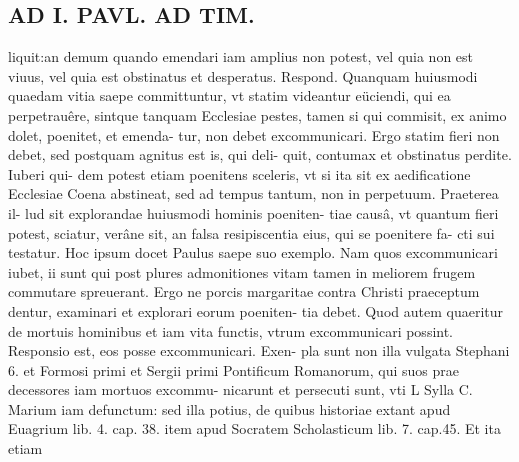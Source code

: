 \documentclass{article}
\begin{document}
\begin{pages}
\section*{AD I. PAVL. AD TIM. }
\marginpar{[ p.330 ]}\pstart liquit:an demum quando emendari iam amplius non potest, vel quia non est viuus, vel quia est obstinatus et desperatus. Respond. Quanquam huiusmodi quaedam vitia saepe committuntur, vt statim videantur eüciendi, qui ea perpetrauêre, sintque tanquam Ecclesiae pestes, tamen si qui commisit, ex animo dolet, poenitet, et emenda- tur, non debet excommunicari. Ergo statim fieri non debet, sed postquam agnitus est is, qui deli- quit, contumax et obstinatus perdite. Iuberi qui- dem potest etiam poenitens sceleris, vt si ita sit ex aedificatione Ecclesiae Coena abstineat, sed ad tempus tantum, non in perpetuum. Praeterea il- lud sit explorandae huiusmodi hominis poeniten- tiae causâ, vt quantum fieri potest, sciatur, verâne sit, an falsa resipiscentia eius, qui se poenitere fa- cti sui testatur. Hoc ipsum docet Paulus saepe suo exemplo. Nam quos excommunicari iubet, ii sunt qui post plures admonitiones vitam tamen in meliorem frugem commutare spreuerant. Ergo ne porcis margaritae contra Christi praeceptum dentur, examinari et explorari eorum poeniten- tia debet. Quod autem quaeritur de mortuis hominibus et iam vita functis, vtrum excommunicari possint. Responsio est, eos posse excommunicari. Exen- pla sunt non illa vulgata Stephani 6. et Formosi primi et Sergii primi Pontificum Romanorum, qui suos prae decessores iam mortuos excommu- nicarunt et persecuti sunt, vti L Sylla C. Marium iam defunctum: sed illa potius, de quibus historiae extant apud Euagrium lib.  4. cap. 38. item apud Socratem Scholasticum lib. 7. cap.45. Et ita etiam  \pend

\end{pages}
\end{document}
